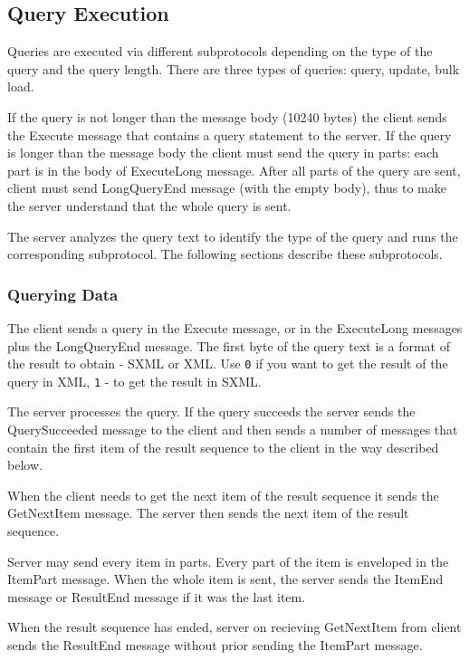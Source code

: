 \documentclass[a4paper,12pt]{article}
\begin{document}
\subsection{Query Execution}

Queries are executed via different subprotocols depending on the type of the query and the query length. There are three types of queries: query, update, bulk load. 

If the query is not longer than the message body (10240 bytes) the client sends the Execute message that contains a query statement to the server. 
If the query is longer than the message body the client must send the query in parts: each part is in the body of ExecuteLong message. After all parts of the query are sent, client must send LongQueryEnd message (with the empty body), thus to make the server understand that the whole query is sent.


The server analyzes the query text to identify the type of the query and runs the corresponding subprotocol. The following sections describe these subprotocols. 

\subsubsection{Querying Data }

The client sends a query in the Execute message, or in the ExecuteLong messages plus the LongQueryEnd message. The first byte of the query text is a format of the result to obtain - SXML \cite{paper:sxml} or XML. Use \verb!0! if you want to get the result of the query in XML, \verb!1! - to get the result in SXML.

The server processes the query. If the query succeeds the server sends the QuerySucceeded message to the client and then sends a number of messages that contain the first item of the result sequence to the client in the way described below.

When the client needs to get the next item of the result sequence it sends the GetNextItem message. The server then sends the next item of the result sequence.

Server may send every item in parts. Every part of the item is enveloped in the ItemPart message. When the whole item is sent, the server sends the ItemEnd message or ResultEnd message if it was the last item.

When the result sequence has ended, server on recieving GetNextItem from client sends the ResultEnd message without prior sending the ItemPart message.
\end{document}
